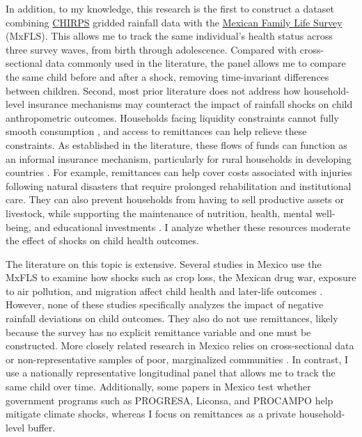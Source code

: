 \documentclass[12pt]{article}
\begin{document}
In addition, to my knowledge, this research is the first to construct a dataset combining \href{https://www.chc.ucsb.edu/data/chirps}{CHIRPS} gridded rainfall data with the \href{https://ennvih-mxfls.org/english/index.html}{Mexican Family Life Survey} (MxFLS). This allows me to track the same individual's health status across three survey waves, from birth through adolescence. Compared with cross-sectional data commonly used in the literature, the panel allows me to compare the same child before and after a shock, removing time-invariant differences between children. Second, most prior literature does not address how household-level insurance mechanisms may counteract the impact of rainfall shocks on child anthropometric outcomes. Households facing liquidity constraints cannot fully smooth consumption \parencite{deatonSavingLiquidityConstraints1991}, and access to remittances can help relieve these constraints. As established in the literature, these flows of funds can function as an informal insurance mechanism, particularly for rural households in developing countries \parencite{yangMigrantRemittances2011}. For example, remittances can help cover costs associated with injuries following natural disasters that require prolonged rehabilitation and institutional care. They can also prevent households from having to sell productive assets or livestock, while supporting the maintenance of nutrition, health, mental well-being, and educational investments \parencite{cook10thAnniversaryReview2008}. I analyze whether these resources moderate the effect of shocks on child health outcomes.

The literature on this topic is extensive. Several studies in Mexico use the MxFLS to examine how shocks such as crop loss, the Mexican drug war, exposure to air pollution, and migration affect child health and later-life outcomes \parencite{michaelsenChildrenRiskEffect2012,brownMexicanDrugWar2018,molinaPollutionAbilityGenderSpecific2021,damonChildhoodObesityMexico2014}. However, none of these studies specifically analyzes the impact of negative rainfall deviations on child outcomes. They also do not use remittances, likely because the survey has no explicit remittance variable and one must be constructed. More closely related research in Mexico relies on cross-sectional data or non-representative samples of poor, marginalized communities \parencite{agueroLongTermEffectClimate2014,skoufiasClimateVariabilityChild2012,adhvaryuHelpingChildrenCatch2024,aguilarNinoChildrenMediumterm2022}. In contrast, I use a nationally representative longitudinal panel that allows me to track the same child over time. Additionally, some papers in Mexico test whether government programs such as PROGRESA, Liconsa, and PROCAMPO help mitigate climate shocks, whereas I focus on remittances as a private household-level buffer.
\end{document}
